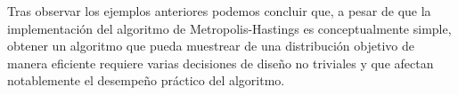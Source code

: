 \documentclass{article}
\begin{document}
\begin{enumerate}
    \begin{center}
        
        

        
        
    \end{center}

    Tras observar los ejemplos anteriores podemos concluir que, a pesar de que la implementación del
    algoritmo de Metropolis-Hastings es conceptualmente simple, obtener un algoritmo que pueda muestrear
    de una distribución objetivo de manera eficiente requiere varias decisiones de diseño no triviales
    y que afectan notablemente el desempeño práctico del algoritmo.
   
\end{enumerate}




 
\end{document}
